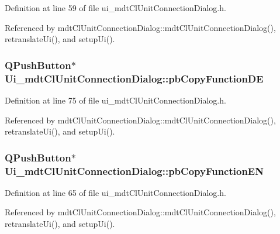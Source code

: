 Definition at line 59 of file ui\-\_\-mdt\-Cl\-Unit\-Connection\-Dialog.\-h.



Referenced by mdt\-Cl\-Unit\-Connection\-Dialog\-::mdt\-Cl\-Unit\-Connection\-Dialog(), retranslate\-Ui(), and setup\-Ui().

\hypertarget{class_ui__mdt_cl_unit_connection_dialog_ad0346f823edd1f2df0665ba5e8247e5f}{
\subsubsection[{pb\-Copy\-Function\-D\-E}]{\setlength{\rightskip}{0pt plus 5cm}Q\-Push\-Button$\ast$ Ui\-\_\-mdt\-Cl\-Unit\-Connection\-Dialog\-::pb\-Copy\-Function\-D\-E}}\label{class_ui__mdt_cl_unit_connection_dialog_ad0346f823edd1f2df0665ba5e8247e5f}


Definition at line 75 of file ui\-\_\-mdt\-Cl\-Unit\-Connection\-Dialog.\-h.



Referenced by mdt\-Cl\-Unit\-Connection\-Dialog\-::mdt\-Cl\-Unit\-Connection\-Dialog(), retranslate\-Ui(), and setup\-Ui().

\hypertarget{class_ui__mdt_cl_unit_connection_dialog_a07be27b792257442fb4d457774660142}{
\subsubsection[{pb\-Copy\-Function\-E\-N}]{\setlength{\rightskip}{0pt plus 5cm}Q\-Push\-Button$\ast$ Ui\-\_\-mdt\-Cl\-Unit\-Connection\-Dialog\-::pb\-Copy\-Function\-E\-N}}\label{class_ui__mdt_cl_unit_connection_dialog_a07be27b792257442fb4d457774660142}


Definition at line 65 of file ui\-\_\-mdt\-Cl\-Unit\-Connection\-Dialog.\-h.



Referenced by mdt\-Cl\-Unit\-Connection\-Dialog\-::mdt\-Cl\-Unit\-Connection\-Dialog(), retranslate\-Ui(), and setup\-Ui().

